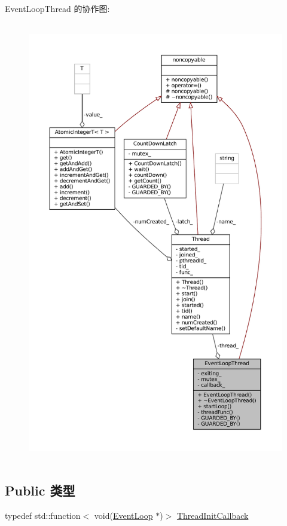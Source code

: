 Event\+Loop\+Thread 的协作图\+:
\nopagebreak
\begin{figure}[H]
\begin{center}
\leavevmode
\includegraphics[height=550pt]{classmuduo_1_1net_1_1EventLoopThread__coll__graph}
\end{center}
\end{figure}
\subsection*{Public 类型}
\begin{DoxyCompactItemize}
\item 
typedef std\+::function$<$ void(\hyperlink{classmuduo_1_1net_1_1EventLoop}{Event\+Loop} $\ast$)$>$ \hyperlink{classmuduo_1_1net_1_1EventLoopThread_a4665880f4633f1e7d95fd6fef6811717}{Thread\+Init\+Callback}
\end{DoxyCompactItemize}
